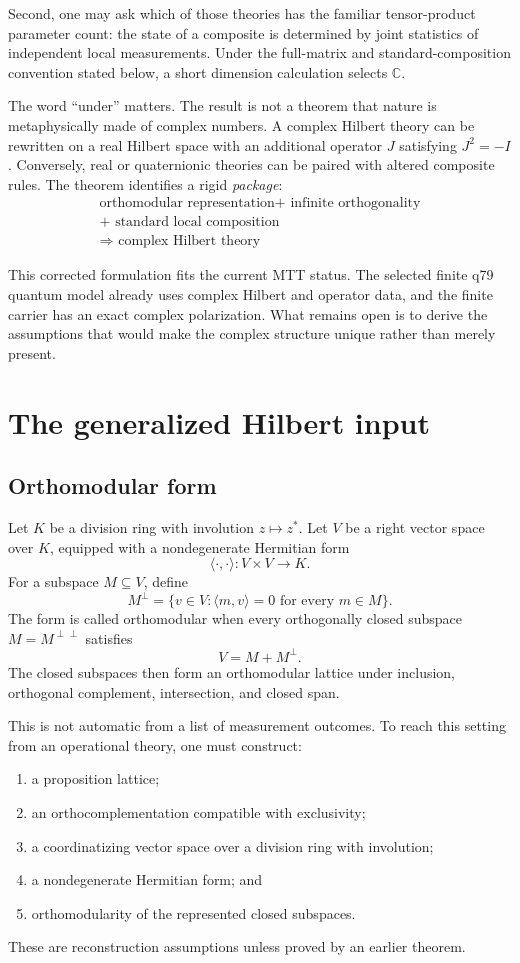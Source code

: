 \documentclass[11pt]{article}
\newcommand{\C}{\mathbb{C}}
\begin{document}
Second, one may ask which of those theories has the familiar tensor-product parameter count: the state of a composite is determined by joint statistics of independent local measurements. Under the full-matrix and standard-composition convention stated below, a short dimension calculation selects \(\C\).

The word ``under'' matters. The result is not a theorem that nature is metaphysically made of complex numbers. A complex Hilbert theory can be rewritten on a real Hilbert space with an additional operator \(J\) satisfying \(J^2=-I\). Conversely, real or quaternionic theories can be paired with altered composite rules. The theorem identifies a rigid \emph{package}:
\[
\begin{gathered}
\text{orthomodular representation}
+\text{ infinite orthogonality}\\
+\text{ standard local composition}\\
\Longrightarrow\text{ complex Hilbert theory}
\end{gathered}
\]

This corrected formulation fits the current MTT status. The selected finite q79 quantum model already uses complex Hilbert and operator data, and the finite carrier has an exact complex polarization. What remains open is to derive the assumptions that would make the complex structure unique rather than merely present.

\section{The generalized Hilbert input}

\subsection{Orthomodular form}

Let \(K\) be a division ring with involution \(z\mapsto z^*\). Let \(V\) be a right vector space over \(K\), equipped with a nondegenerate Hermitian form
\[
\langle\cdot,\cdot\rangle:V\times V\longrightarrow K.
\]
For a subspace \(M\subseteq V\), define
\[
M^\perp=\{v\in V:\langle m,v\rangle=0\text{ for every }m\in M\}.
\]
The form is called orthomodular when every orthogonally closed subspace
\(M=M^{\perp\perp}\) satisfies
\[
V=M+M^\perp.
\]
The closed subspaces then form an orthomodular lattice under inclusion, orthogonal complement, intersection, and closed span.

This is not automatic from a list of measurement outcomes. To reach this setting from an operational theory, one must construct:
\begin{enumerate}
\item a proposition lattice;
\item an orthocomplementation compatible with exclusivity;
\item a coordinatizing vector space over a division ring with involution;
\item a nondegenerate Hermitian form; and
\item orthomodularity of the represented closed subspaces.
\end{enumerate}
These are reconstruction assumptions unless proved by an earlier theorem.
\end{document}
